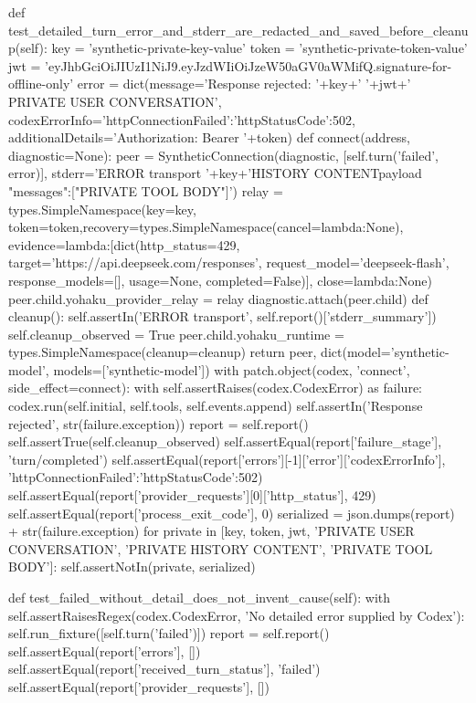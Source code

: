     def test_detailed_turn_error_and_stderr_are_redacted_and_saved_before_cleanup(self):
        key = 'synthetic-private-key-value'
        token = 'synthetic-private-token-value'
        jwt = 'eyJhbGciOiJIUzI1NiJ9.eyJzdWIiOiJzeW50aGV0aWMifQ.signature-for-offline-only'
        error = dict(message='Response rejected: '+key+' '+jwt+' PRIVATE USER CONVERSATION',
                     codexErrorInfo={'httpConnectionFailed':{'httpStatusCode':502}},
                     additionalDetails='Authorization: Bearer '+token)
        def connect(address, diagnostic=None):
            peer = SyntheticConnection(diagnostic, [self.turn('failed', error)],
                                       stderr='ERROR transport '+key+'\nPRIVATE HISTORY CONTENT\nERROR payload {"messages":["PRIVATE TOOL BODY"]}\n')
            relay = types.SimpleNamespace(key=key, token=token,recovery=types.SimpleNamespace(cancel=lambda:None), evidence=lambda:[dict(http_status=429,
                    target='https://api.deepseek.com/responses', request_model='deepseek-flash',
                    response_models=[], usage=None, completed=False)], close=lambda:None)
            peer.child.yohaku_provider_relay = relay
            diagnostic.attach(peer.child)
            def cleanup():
                self.assertIn('ERROR transport', self.report()['stderr_summary'])
                self.cleanup_observed = True
            peer.child.yohaku_runtime = types.SimpleNamespace(cleanup=cleanup)
            return peer, dict(model='synthetic-model', models=['synthetic-model'])
        with patch.object(codex, 'connect', side_effect=connect):
            with self.assertRaises(codex.CodexError) as failure:
                codex.run(self.initial, self.tools, self.events.append)
        self.assertIn('Response rejected', str(failure.exception))
        report = self.report()
        self.assertTrue(self.cleanup_observed)
        self.assertEqual(report['failure_stage'], 'turn/completed')
        self.assertEqual(report['errors'][-1]['error']['codexErrorInfo'], {'httpConnectionFailed':{'httpStatusCode':502}})
        self.assertEqual(report['provider_requests'][0]['http_status'], 429)
        self.assertEqual(report['process_exit_code'], 0)
        serialized = json.dumps(report) + str(failure.exception)
        for private in [key, token, jwt, 'PRIVATE USER CONVERSATION', 'PRIVATE HISTORY CONTENT', 'PRIVATE TOOL BODY']:
            self.assertNotIn(private, serialized)

    def test_failed_without_detail_does_not_invent_cause(self):
        with self.assertRaisesRegex(codex.CodexError, 'No detailed error supplied by Codex'):
            self.run_fixture([self.turn('failed')])
        report = self.report()
        self.assertEqual(report['errors'], [])
        self.assertEqual(report['received_turn_status'], 'failed')
        self.assertEqual(report['provider_requests'], [])

